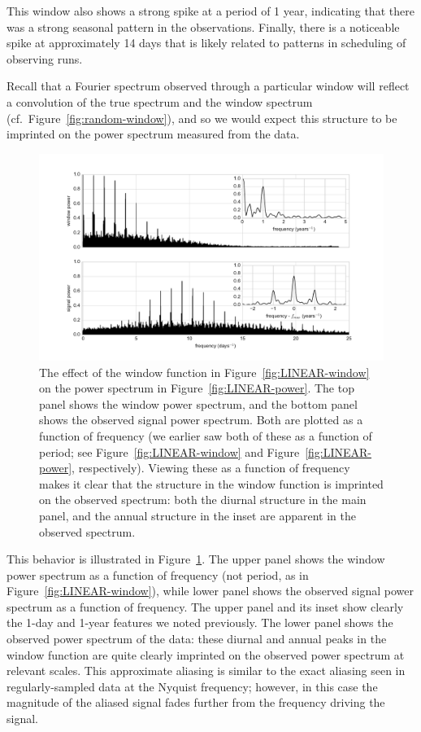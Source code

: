 \documentclass[preprint]{aastex}
\newcommand{\fig}[1]{Figure~\ref{fig:#1}}
\newcommand{\figlabel}[1]{\label{fig:#1}}
\begin{document}
This window also shows a strong spike at a period of 1 year, indicating that
there was a strong seasonal pattern in the observations.
Finally, there is a noticeable spike at approximately 14 days that is likely
related to patterns in scheduling of observing runs.

Recall that a Fourier spectrum observed through a particular window will reflect
a convolution of the true spectrum and the window spectrum
(cf.\ \fig{random-window}), and so we would expect this structure to be
imprinted on the power spectrum measured from the data.


\begin{figure}[ht]
  \centering
  \includegraphics[width=\textwidth]{fig15_LINEAR_window_effect}
  \caption{The effect of the window function in \fig{LINEAR-window} on the
    power spectrum in \fig{LINEAR-power}.
    The top panel shows the window power spectrum, and the bottom panel shows
    the observed signal power spectrum.
    Both are plotted as a function of frequency (we earlier saw both of these
    as a function of period; see \fig{LINEAR-window} and \fig{LINEAR-power},
    respectively).
    Viewing these as a function of frequency makes it clear that the structure
    in the window function is imprinted on the observed spectrum: both the
    diurnal structure in the main panel, and the annual structure in the inset
    are apparent in the observed spectrum.
    \figlabel{LINEAR-window-effect}}
\end{figure}

This behavior is illustrated in \fig{LINEAR-window-effect}.
The upper panel shows the window power spectrum as a function of frequency (not period, as in \fig{LINEAR-window}), while lower panel shows the observed signal power spectrum as a function of frequency.
The upper panel and its inset show clearly the 1-day and 1-year features we noted previously.
The lower panel shows the observed power spectrum of the data: these diurnal and annual peaks in the window function are quite clearly imprinted on the observed power spectrum at relevant scales.
This approximate aliasing is similar to the exact aliasing seen in regularly-sampled data at the Nyquist frequency; however, in this case the magnitude of the
aliased signal fades further from the frequency driving the signal.
\end{document}
